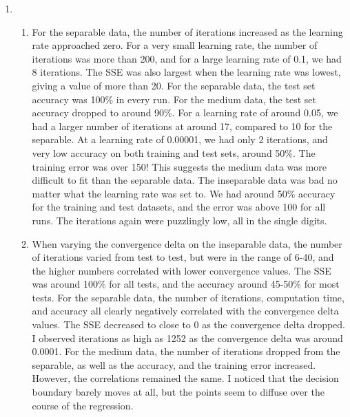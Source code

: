 \documentclass[10pt,oneside,reqno]{amsart}
\theoremstyle{plain}
\theoremstyle{definition}
\begin{document}
\begin{enumerate}[label=4.]

\item

\begin{enumerate}
\item For the separable data, the number of iterations increased as the learning rate approached zero. For a very small learning rate, the number of iterations was more than 200, and for a large learning rate of 0.1, we had 8 iterations. The SSE was also largest when the learning rate was lowest, giving a value of more than 20. For the separable data, the test set accuracy was 100\% in every run. For the medium data, the test set accuracy dropped to around 90\%. For a learning rate of around 0.05, we had a larger number of iterations at around 17, compared to 10 for the separable. At a learning rate of 0.00001, we had only 2 iterations, and very low accuracy on both training and test sets, around 50\%. The training error was over 150! This suggests the medium data was more difficult to fit than the separable data. The inseparable data was bad no matter what the learning rate was set to. We had around 50\% accuracy for the training and test datasets, and the error was above 100 for all runs. The iterations again were puzzlingly low, all in the single digits. 

\item When varying the convergence delta on the inseparable data, the number of iterations varied from test to test, but were in the range of 6-40, and the higher numbers correlated with lower convergence values. The SSE was around 100\% for all tests, and the accuracy around 45-50\% for most tests. For the separable data, the number of iterations, computation time, and accuracy all clearly negatively correlated with the convergence delta values. The SSE decreased to close to 0 as the convergence delta dropped. I observed iterations as high as 1252 as the convergence delta was around 0.0001. For the medium data, the number of iterations dropped from the separable, as well as the accuracy, and the training error increased. However, the correlations remained the same. I noticed that the decision boundary barely moves at all, but the points seem to diffuse over the course of the regression. 


\end{enumerate}



\end{enumerate}
\end{document}
